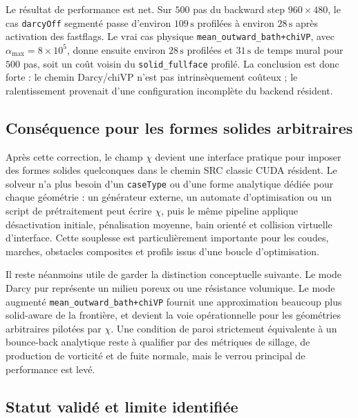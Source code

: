 \documentclass[11pt,a4paper]{article}
\begin{document}
Le résultat de performance est net. Sur $500$ pas du backward step $960\times480$, le cas \texttt{darcyOff} segmenté passe d'environ $109\,\si{\second}$ profilées à environ $28\,\si{\second}$ après activation des fastflags. Le vrai cas physique \texttt{mean\_outward\_bath+chiVP}, avec $\alpha_{\max}=8\times10^5$, donne ensuite environ $28\,\si{\second}$ profilées et $31\,\si{\second}$ de temps mural pour $500$ pas, soit un coût voisin du \texttt{solid\_fullface} profilé. La conclusion est donc forte : le chemin Darcy/chiVP n'est pas intrinsèquement coûteux ; le ralentissement provenait d'une configuration incomplète du backend résident.

\subsection{Conséquence pour les formes solides arbitraires}

Après cette correction, le champ $\chi$ devient une interface pratique pour imposer des formes solides quelconques dans le chemin SRC classic CUDA résident. Le solveur n'a plus besoin d'un \texttt{caseType} ou d'une forme analytique dédiée pour chaque géométrie : un générateur externe, un automate d'optimisation ou un script de prétraitement peut écrire $\chi$, puis le même pipeline applique désactivation initiale, pénalisation moyenne, bain orienté et collision virtuelle d'interface. Cette souplesse est particulièrement importante pour les coudes, marches, obstacles composites et profils issus d'une boucle d'optimisation.

Il reste néanmoins utile de garder la distinction conceptuelle suivante. Le mode Darcy pur représente un milieu poreux ou une résistance volumique. Le mode augmenté \texttt{mean\_outward\_bath+chiVP} fournit une approximation beaucoup plus solid-aware de la frontière, et devient la voie opérationnelle pour les géométries arbitraires pilotées par $\chi$. Une condition de paroi strictement équivalente à un bounce-back analytique reste à qualifier par des métriques de sillage, de production de vorticité et de fuite normale, mais le verrou principal de performance est levé.

\subsection{Statut validé et limite identifiée}
\end{document}
